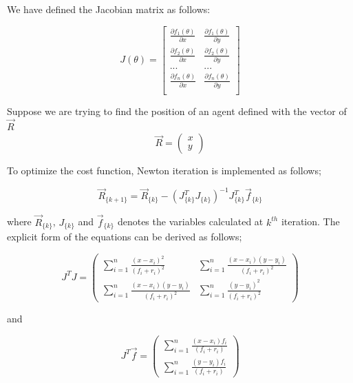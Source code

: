 We have defined the Jacobian matrix as follows:

\begin{equation}
J(\theta) = \begin{bmatrix}
\frac{\partial{f_1(\theta)}}{\partial{x}} & \frac{\partial{f_1(\theta)}}{\partial{y}} \\
\frac{\partial{f_2(\theta)}}{\partial{x}} & \frac{\partial{f_2(\theta)}}{\partial{y}} \\
... & ... \\
\frac{\partial{f_n(\theta)}}{\partial{x}} & \frac{\partial{f_n(\theta)}}{\partial{y}} \\
\end{bmatrix}
\end{equation}

	
Suppose we are trying to find the position of an agent defined with the vector of $\vec{R}$	
\begin{equation}
 \vec{R} = \left(\begin{matrix}
  x \\ y 
 \end{matrix}\right)
\end{equation}

To optimize the cost function, Newton iteration is implemented as follows;

\begin{equation}
 \vec{R}_{\{k+1\}} =  \vec{R}_{\{k\}} - (J^T_{\{k\}}J_{\{k\}})^{-1}J^T_{\{k\}}\vec{f}_{\{k\}}
\end{equation}	

where $\vec{R}_{\{k\}}$, $J_{\{k\}}$ and $\vec{f}_{\{k\}}$ denotes the variables calculated at $k^{th}$ iteration. The explicit form of the equations can be derived as follows;
	
\begin{equation}
J^TJ = \left(\begin{matrix}
\sum_{i=1}^{n} \frac{(x-x_i)^2}{(f_i+r_i)^2} &  \sum_{i=1}^{n} \frac{(x-x_i)(y-y_i)}{(f_i+r_i)^2} \\
\sum_{i=1}^{n} \frac{(x-x_i)(y-y_i)}{(f_i+r_i)^2} &  \sum_{i=1}^{n} \frac{(y-y_i)^2}{(f_i+r_i)^2}
\end{matrix}\right)
\end{equation}	

and 

\begin{equation}
J^T\vec{f} = \left(\begin{matrix}
\sum_{i=1}^{n}\frac{(x-x_i)f_i}{(f_i+r_i)} \\
\sum_{i=1}^{n}\frac{(y-y_i)f_i}{(f_i+r_i)}
\end{matrix}\right)
\end{equation}
	
